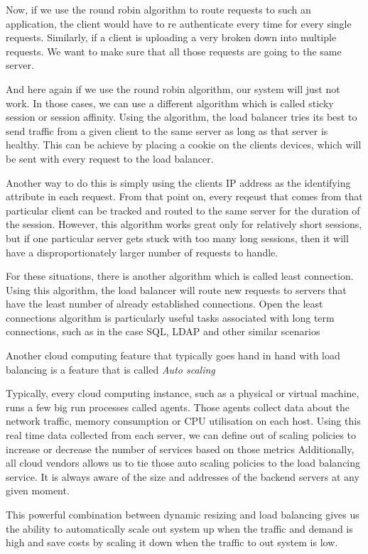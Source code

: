 Now, if we use the round robin algorithm to route requests to such an application, the client would have to re authenticate every time for every single requests.
Similarly, if a client is uploading a very broken down into multiple requests.
We want to make sure that all those requests are going to the same server.

And here again if we use the round robin algorithm, our system will just not work.
In those cases, we can use a different algorithm which is called sticky session or session affinity.
Using the algorithm, the load balancer tries its best to send traffic from a given client to the same server as long as that server is healthy.
This can be achieve by placing a cookie on the clients devices, which will be sent with every request to the load balancer.

Another way to do this is simply using the clients IP address as the identifying attribute in each request.
From that point on, every reqeust that comes from that particular client can be tracked and routed to the same server for the duration of the session.
However, this algorithm works great only for relatively short sessions, but if one particular server gets stuck with too many long sessions, then it will have a disproportionately larger number of requests to handle.

For these situations, there is another algorithm which is called least connection.
Using this algorithm, the load balancer will route new requests to servers that have the least number of already established connections.
Open the least connections algorithm is particularly useful tasks associated with long term connections, such as in the case SQL, LDAP and other similar scenarios

Another cloud computing feature that typically goes hand in hand with load balancing is a feature that is called \textit{Auto scaling}

Typically, every cloud computing instance, such as a physical or virtual machine, runs a few big run processes called agents.
Those agents collect data about the network traffic, memory consumption or CPU utilisation on each host.
Using this real time data collected from each server, we can define out of scaling policies to increase or decrease the number of services based on those metrics
Additionally, all cloud vendors allows us to tie those auto scaling policies to the load balancing service.
It is always aware of the size and addresses of the backend servers at any given moment.

This powerful combination between dynamic resizing and load balancing gives us the ability to automatically scale out system up when the traffic and demand is high and save costs by scaling it down when the traffic to out system is low.

